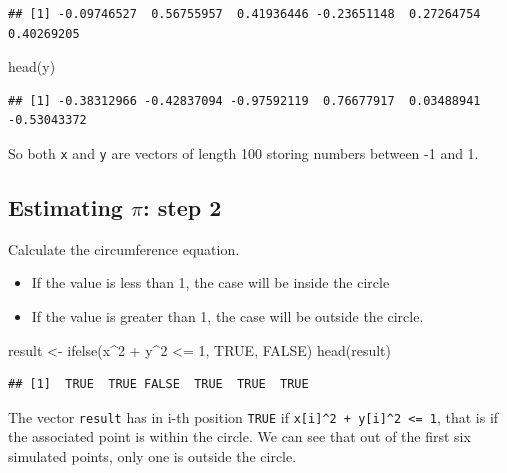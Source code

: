 \documentclass[
]{book}
\newenvironment{Shaded}{\begin{snugshade}}{\end{snugshade}}
\newcommand{\ConstantTok}[1]{\textcolor[rgb]{0.00,0.00,0.00}{#1}}
\newcommand{\DecValTok}[1]{\textcolor[rgb]{0.00,0.00,0.81}{#1}}
\newcommand{\FunctionTok}[1]{\textcolor[rgb]{0.00,0.00,0.00}{#1}}
\newcommand{\NormalTok}[1]{#1}
\newcommand{\OtherTok}[1]{\textcolor[rgb]{0.56,0.35,0.01}{#1}}
\newcommand{\SpecialCharTok}[1]{\textcolor[rgb]{0.00,0.00,0.00}{#1}}
\providecommand{\tightlist}{%
  \setlength{\itemsep}{0pt}\setlength{\parskip}{0pt}}
\begin{document}
\begin{verbatim}
## [1] -0.09746527  0.56755957  0.41936446 -0.23651148  0.27264754  0.40269205
\end{verbatim}

\begin{Shaded}
\begin{Highlighting}[]
\FunctionTok{head}\NormalTok{(y)}
\end{Highlighting}
\end{Shaded}

\begin{verbatim}
## [1] -0.38312966 -0.42837094 -0.97592119  0.76677917  0.03488941 -0.53043372
\end{verbatim}

So both \texttt{x} and \texttt{y} are vectors of length 100 storing numbers between -1 and 1.

\hypertarget{estimating-pi-step-2}{%
\subsection{\texorpdfstring{Estimating \(\pi\): step 2}{Estimating \textbackslash pi: step 2}}\label{estimating-pi-step-2}}

Calculate the circumference equation.

\begin{itemize}
\tightlist
\item
  If the value is less than 1, the case will be inside the circle
\item
  If the value is greater than 1, the case will be outside the circle.
\end{itemize}

\begin{Shaded}
\begin{Highlighting}[]
\NormalTok{result }\OtherTok{\textless{}{-}} \FunctionTok{ifelse}\NormalTok{(x}\SpecialCharTok{\^{}}\DecValTok{2} \SpecialCharTok{+}\NormalTok{ y}\SpecialCharTok{\^{}}\DecValTok{2} \SpecialCharTok{\textless{}=} \DecValTok{1}\NormalTok{, }\ConstantTok{TRUE}\NormalTok{, }\ConstantTok{FALSE}\NormalTok{)}
\FunctionTok{head}\NormalTok{(result)}
\end{Highlighting}
\end{Shaded}

\begin{verbatim}
## [1]  TRUE  TRUE FALSE  TRUE  TRUE  TRUE
\end{verbatim}

The vector \texttt{result} has in i-th position \texttt{TRUE} if \texttt{x{[}i{]}\^{}2\ +\ y{[}i{]}\^{}2\ \textless{}=\ 1}, that is if the associated point is within the circle. We can see that out of the first six simulated points, only one is outside the circle.
\end{document}
